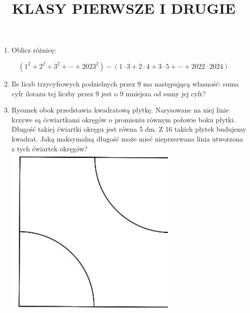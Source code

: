 \documentclass[10pt]{article}
\title{KLASY PIERWSZE I DRUGIE }
\author{}
\date{}
\begin{document}
\maketitle
\begin{enumerate}
  \item Oblicz różnicę:
\end{enumerate}

\[
\left(1^{2}+2^{2}+3^{2}+\cdots+2023^{2}\right)-(1 \cdot 3+2 \cdot 4+3 \cdot 5+\cdots+2022 \cdot 2024)
\]

\begin{enumerate}
  \setcounter{enumi}{1}
  \item Ile liczb trzycyfrowych podzielnych przez 9 ma następującą własność: suma cyfr ilorazu tej liczby przez 9 jest o 9 mniejsza od sumy jej cyfr?
  \item Rysunek obok przedstawia kwadratową płytkę. Narysowane na niej linie krzywe są ćcwiartkami okręgów o promieniu równym połowie boku płytki. Długość takiej ćwiartki okręgu jest równa 5 dm. Z 16 takich płytek budujemy kwadrat. Jaką maksymalną długość może mieć nieprzerwana linia utworzona z tych ćwiartek okręgów?\\
\includegraphics[max width=\textwidth, center]{2024_11_21_982dd79c5ffd7d726118g-1}
\end{enumerate}
\end{document}
